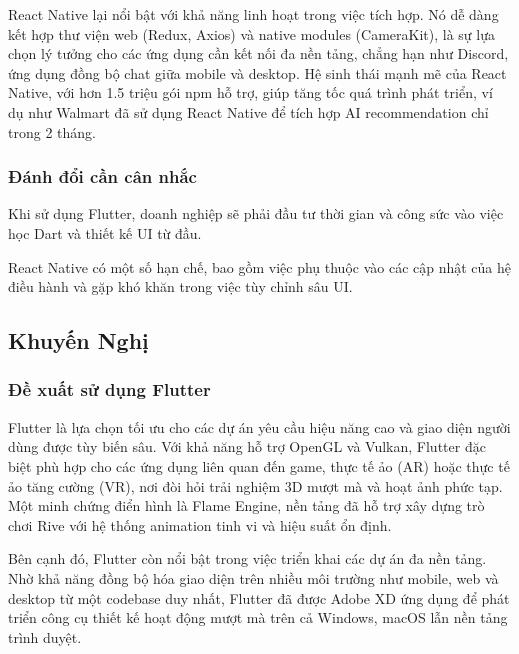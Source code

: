     \hspace*{0.8cm}React Native lại nổi bật với khả năng linh hoạt trong việc tích hợp. Nó dễ dàng kết hợp thư viện web (Redux, Axios) và native modules (CameraKit), là sự lựa chọn lý tưởng cho các ứng dụng cần kết nối đa nền tảng, chẳng hạn như Discord, ứng dụng đồng bộ chat giữa mobile và desktop. Hệ sinh thái mạnh mẽ của React Native, với hơn 1.5 triệu gói npm hỗ trợ, giúp tăng tốc quá trình phát triển, ví dụ như Walmart đã sử dụng React Native để tích hợp AI recommendation chỉ trong 2 tháng.
\vspace{0.5em}

\subsubsection{Đánh đổi cần cân nhắc}

    \hspace*{0.8cm}Khi sử dụng Flutter, doanh nghiệp sẽ phải đầu tư thời gian và công sức vào việc học Dart và thiết kế UI từ đầu.
\vspace{0.5em}


    \hspace*{0.8cm}React Native có một số hạn chế, bao gồm việc phụ thuộc vào các cập nhật của hệ điều hành và gặp khó khăn trong việc tùy chỉnh sâu UI.
\vspace{0.5em}

\subsection{Khuyến Nghị}

\subsubsection{Đề xuất sử dụng Flutter}

\indent Flutter là lựa chọn tối ưu cho các dự án yêu cầu hiệu năng cao và giao diện người dùng được tùy biến sâu. Với khả năng hỗ trợ OpenGL và Vulkan, Flutter đặc biệt phù hợp cho các ứng dụng liên quan đến game, thực tế ảo (AR) hoặc thực tế ảo tăng cường (VR), nơi đòi hỏi trải nghiệm 3D mượt mà và hoạt ảnh phức tạp. Một minh chứng điển hình là Flame Engine, nền tảng đã hỗ trợ xây dựng trò chơi Rive với hệ thống animation tinh vi và hiệu suất ổn định.

\indent Bên cạnh đó, Flutter còn nổi bật trong việc triển khai các dự án đa nền tảng. Nhờ khả năng đồng bộ hóa giao diện trên nhiều môi trường như mobile, web và desktop từ một codebase duy nhất, Flutter đã được Adobe XD ứng dụng để phát triển công cụ thiết kế hoạt động mượt mà trên cả Windows, macOS lẫn nền tảng trình duyệt.

